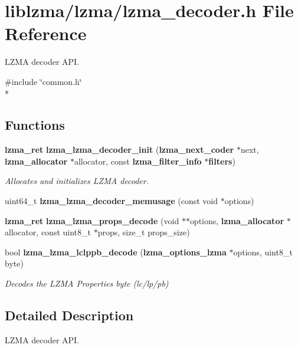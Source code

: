 \section{liblzma/lzma/lzma\-\_\-decoder.h File Reference}
\label{lzma__decoder_8h}


L\-Z\-M\-A decoder A\-P\-I.  


{\ttfamily \#include \char`\"{}common.\-h\char`\"{}}\\*
\subsection*{Functions}
\begin{DoxyCompactItemize}
\item 
{\bf lzma\-\_\-ret} {\bf lzma\-\_\-lzma\-\_\-decoder\-\_\-init} ({\bf lzma\-\_\-next\-\_\-coder} $\ast$next, {\bf lzma\-\_\-allocator} $\ast$allocator, const {\bf lzma\-\_\-filter\-\_\-info} $\ast${\bf filters})
\begin{DoxyCompactList}\small\item\em Allocates and initializes L\-Z\-M\-A decoder. \end{DoxyCompactList}\item 
uint64\-\_\-t {\bfseries lzma\-\_\-lzma\-\_\-decoder\-\_\-memusage} (const void $\ast$options)\label{lzma__decoder_8h_aad2f0056516cc2d78de478a41418307e}

\item 
{\bf lzma\-\_\-ret} {\bfseries lzma\-\_\-lzma\-\_\-props\-\_\-decode} (void $\ast$$\ast$options, {\bf lzma\-\_\-allocator} $\ast$allocator, const uint8\-\_\-t $\ast$props, size\-\_\-t props\-\_\-size)\label{lzma__decoder_8h_aba6901f5619ec431f49699a09fa620e1}

\item 
bool {\bf lzma\-\_\-lzma\-\_\-lclppb\-\_\-decode} ({\bf lzma\-\_\-options\-\_\-lzma} $\ast$options, uint8\-\_\-t byte)
\begin{DoxyCompactList}\small\item\em Decodes the L\-Z\-M\-A Properties byte (lc/lp/pb) \end{DoxyCompactList}\end{DoxyCompactItemize}


\subsection{Detailed Description}
L\-Z\-M\-A decoder A\-P\-I. 

